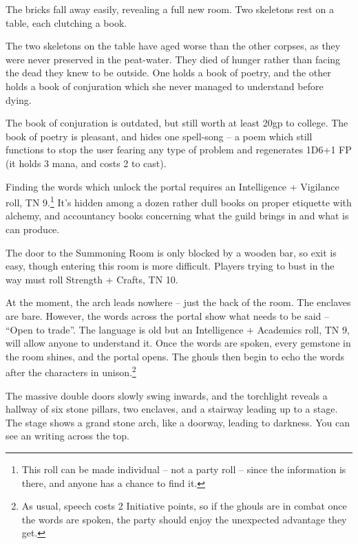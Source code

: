 \begin{multicols}{2}
\begin{boxtext}

	The bricks fall away easily, revealing a full new room.  Two skeletons rest on a table, each clutching a book.

\end{boxtext}

The two skeletons on the table have aged worse than the other corpses, as they were never preserved in the peat-water.
They died of hunger rather than facing the dead they knew to be outside.
One holds a book of poetry, and the other holds a book of conjuration which she never managed to understand before dying.

The book of conjuration is outdated, but still worth at least 20gp to \gls{college}.  The book of poetry is pleasant, and hides one spell-song -- a poem which still functions to stop the user fearing any type of problem and regenerates 1D6+1 FP (it holds 3 mana, and costs 2 to cast).

Finding the words which unlock the portal requires an Intelligence + Vigilance roll, TN 9.\footnote{This roll can be made individual -- not a party roll -- since the information is there, and anyone has a chance to find it.}
It's hidden among a dozen rather dull books on proper etiquette with alchemy, and accountancy books concerning what the guild brings in and what is can produce.

The door to the Summoning Room is only blocked by a wooden bar, so exit is easy, though entering this room is more difficult.
Players trying to bust in the way must roll Strength + Crafts, TN 10.


At the moment, the arch leads nowhere  -- just the back of the room.  The enclaves are bare.
However, the words across the portal show what needs to be said -- ``Open to trade''.
The language is old but an Intelligence + Academics roll, TN 9, will allow anyone to understand it.
Once the words are spoken, every gemstone in the room shines, and the portal opens.
The ghouls then begin to echo the words after the characters in unison.\footnote{As usual, speech costs 2 Initiative points, so if the ghouls are in combat once the words are spoken, the party should enjoy the unexpected advantage they get.}

\begin{boxtext}

	The massive double doors slowly swing inwards, and the torchlight reveals a hallway of six stone pillars, two enclaves, and a stairway leading up to a stage.  The stage shows a grand stone arch, like a doorway, leading to darkness.
	You can see an writing across the top.


\end{boxtext}
\end{multicols}
